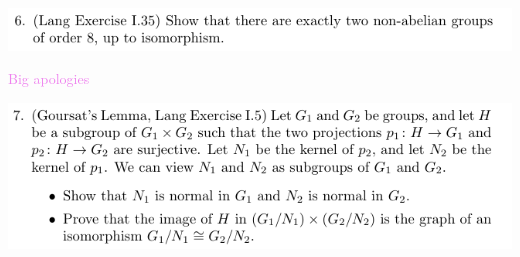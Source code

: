 \documentclass[12pt,letterpaper,boxed]{hmcpset}
\newcommand{\wg}[1]{\textcolor{violet}{#1}}
\begin{document}
\newpage


\begin{problem}
	\includegraphics[scale=0.8]{6.png}
	\hfill
\end{problem}

\begin{solution}
\wg{Big apologies}
\end{solution}

\newpage


\begin{problem}
	\includegraphics[scale=0.8]{7.png}
	\hfill
\end{problem}
\end{document}

